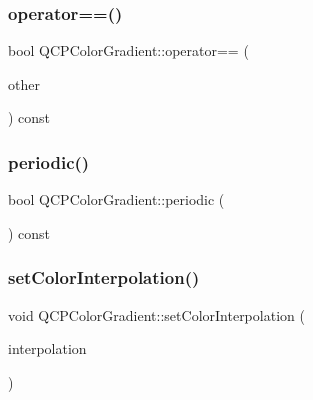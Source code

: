 \mbox{\label{class_q_c_p_color_gradient_a7f3478c33c59aa3c03b9ea1f809877fa}} 
\subsubsection{\texorpdfstring{operator==()}{operator==()}}
{\footnotesize\ttfamily bool Q\+C\+P\+Color\+Gradient\+::operator== (\begin{DoxyParamCaption}\item[{const \mbox{\hyperlink{class_q_c_p_color_gradient}{Q\+C\+P\+Color\+Gradient}} \&}]{other }\end{DoxyParamCaption}) const}

\mbox{\label{class_q_c_p_color_gradient_a22a1d2b17f203caf0dcec833507fb9e0}} 
\subsubsection{\texorpdfstring{periodic()}{periodic()}}
{\footnotesize\ttfamily bool Q\+C\+P\+Color\+Gradient\+::periodic (\begin{DoxyParamCaption}{ }\end{DoxyParamCaption}) const\hspace{0.3cm}{\ttfamily [inline]}}

\mbox{\label{class_q_c_p_color_gradient_aa13fda86406e1d896a465a409ae63b38}} 
\subsubsection{\texorpdfstring{setColorInterpolation()}{setColorInterpolation()}}
{\footnotesize\ttfamily void Q\+C\+P\+Color\+Gradient\+::set\+Color\+Interpolation (\begin{DoxyParamCaption}\item[{\mbox{\hyperlink{class_q_c_p_color_gradient_ac5dca17cc24336e6ca176610e7f77fc1}{Q\+C\+P\+Color\+Gradient\+::\+Color\+Interpolation}}}]{interpolation }\end{DoxyParamCaption})}

